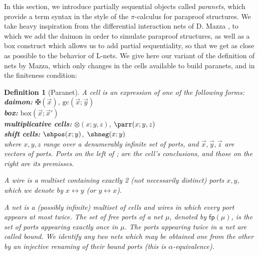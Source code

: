 \documentclass[12pt]{report}
\newcommand{\dai}{✠}
\newtheorem{definition}{Definition}
\begin{document}
In this section, we introduce partially sequential objects called \emph{paranets}, which provide a
term syntax in the style of the $\pi$-calculus for paraproof structures. We take heavy inspiration
from the differential interaction nets of D. Mazza \cite{Maz16}, to which we add the daimon in order
to simulate paraproof structures, as well as a box construct which allows us to add partial
sequentiality, so that we get as close as possible to the behavior of L-nets. We give here our
variant of the definition of nets by Mazza, which only changes in the cells available to build
paranets, and in the finiteness condition:


\begin{definition}[Paranet]
    A \emph{cell} is an expression of one of the following forms:\\[5pt]
    {\normalfont \bf daimon:} $\dai(\vec{x})$, $\mathrm{gc}(\vec{x};\vec{y})$\\
    {\normalfont \bf box:} $\mathrm{box}(\vec{x}; \vec{x}')$\\
    {\normalfont \bf multiplicative cells:} $\otimes(x; y, z)$, $\parr(x; y, z)$\\
    {\normalfont \bf shift cells:} $\shpos(x; y)$, $\shneg(x; y)$\\[5pt]
    where $x, y, z$ range over a denumerably infinite set of \emph{ports}, and $\vec{x}, \vec{y},
    \vec{z}$ are vectors of ports. Ports on the left of ; are the cell's \emph{conclusions}, and
    those on the right are its \emph{premisses}.

    A \emph{wire} is a multiset containing exactly 2 (not necessarily distinct) ports $x, y$, which
    we denote by $x \leftrightarrow y$ (or $y \leftrightarrow x$).

    A \emph{net} is a (possibly infinite) multiset of cells and wires in which every port appears at
    most twice. The set of \emph{free ports} of a net $μ$, denoted by $\mathsf{fp}(μ)$, is the set
    of ports appearing exactly once in $μ$. The ports appearing twice in a net are called
    \emph{bound}. We identify any two nets which may be obtained one from the other by an injective
    renaming of their bound ports (this is \emph{$α$-equivalence}).


\end{definition}
\end{document}

